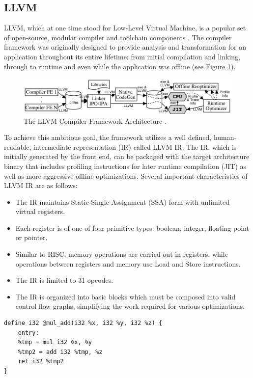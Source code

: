 \subsection{LLVM}
\label{sec:llvm}
LLVM, which at one time stood for Low-Level Virtual Machine, is a popular set of open-source, modular compiler and toolchain components \cite{lattner2004llvm}.
The compiler framework was originally designed to provide analysis and transformation for an application throughout its entire lifetime: from initial compilation and linking, through to runtime and even while the application was offline (see Figure \ref{fig:llvmarch}).
\begin{figure}
    \includegraphics[width=\textwidth]{images/llvm-architecture.png}
    \caption{ The LLVM Compiler Framework Architecture \cite{lattner2004llvm}.}
    \label{fig:llvmarch}
    \Description[]{}
\end{figure}
To achieve this ambitious goal, the framework utilizes a well defined, human-readable, intermediate representation (IR) called LLVM IR.
The IR, which is initially generated by the front end, can be packaged with the target architecture binary that includes profiling instructions for later runtime compilation (JIT) as well as more aggressive offline optimizations.
Several important characteristics of LLVM IR are as follows:
\begin{itemize}
    \item The IR maintains Static Single Assignment (SSA) form with unlimited virtual registers.
    \item Each register is of one of four primitive types: boolean, integer, floating-point or pointer.
    \item Similar to RISC, memory operations are carried out in registers, while operations between registers and memory use Load and Store instructions.
    \item The IR is limited to 31 opcodes.
    \item The IR is organized into basic blocks which must be composed into valid control flow graphs, simplifying the work required for various optimizations. 
\end{itemize}

\begin{lstlisting}[float,floatplacement=H,
caption={LLVM IR for a function returing x * y + z \cite{LLVM_Jit_Tutorial}.},
label=lst:llvm_ir]
define i32 @mul_add(i32 %x, i32 %y, i32 %z) {
    entry:
    %tmp = mul i32 %x, %y
    %tmp2 = add i32 %tmp, %z
    ret i32 %tmp2
}\end{lstlisting}

